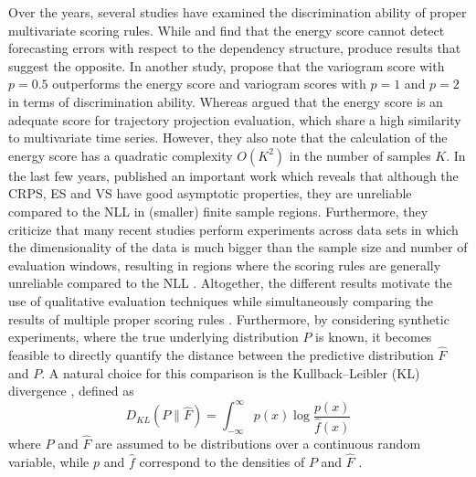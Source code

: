 \documentclass[a4paper,oneside,bibliography=totoc]{scrbook}
\begin{document}
\noindent
Over the years, several studies have examined the discrimination ability of proper multivariate scoring rules. 
While \citet{pinson_discrimination_2013} and  \citet{scheuerer_variogram-based_2015} find that the energy score cannot detect forecasting errors with respect to the dependency structure, \citet{ziel_multivariate_2019} produce results that suggest the opposite. 
In another study, \citet{alexander_evaluating_2024} propose that the variogram score with $p=0.5$ outperforms the energy score and variogram scores with $p=1$ and $p=2$ in terms of discrimination ability. 
Whereas \citet{shahroudi_evaluation_2024} argued that the energy score is an adequate score for trajectory projection evaluation, which share a high similarity to multivariate time series. However, they also note that the calculation of the energy score has a quadratic complexity $O(K^2)$ in the number of samples $K$.
In the last few years, \citet{marcotte_regions_2023} published an important work which reveals that although the CRPS, ES and VS have good asymptotic properties, they are unreliable compared to the NLL in (smaller) finite sample regions. Furthermore, they criticize that many recent studies \cite{salinas_high-dimensional_2019, rasul_multivariate_2020, de_bezenac_normalizing_2020, rasul_autoregressive_2021, tashiro_csdi_2021, tang_probabilistic_2021, drouin_tactis_2022} perform experiments across data sets in which the dimensionality of the data is much bigger than the sample size and number of evaluation windows, resulting in regions where the scoring rules are generally unreliable compared to the NLL \cite{marcotte_regions_2023}.
Altogether, the different results motivate the use of qualitative evaluation techniques while simultaneously comparing the results of multiple proper scoring rules \cite{alexander_evaluating_2024, koochali_random_2022}.
Furthermore, by considering synthetic experiments, where the true underlying distribution $P$ is known, it becomes feasible to directly quantify the distance between the predictive distribution $\hat{F}$ and $P$. 
A natural choice for this comparison is the Kullback–Leibler (KL) divergence \cite{kullback_information_1951, kullback_information_1997}, defined as
\begin{equation}
    D_{KL}(P\parallel \hat{F})=\int_{-\infty}^{\infty} p(x)\log\frac{p(x)}{\hat{f}(x)}
    \label{eq:KL}
\end{equation}
where $P$ and $\hat{F}$ are assumed to be distributions over a continuous random variable, while $p$ and $\hat{f}$ correspond to the densities of $P$ and $\hat{F}$ \cite{bishop_pattern_2019}.
\end{document}
